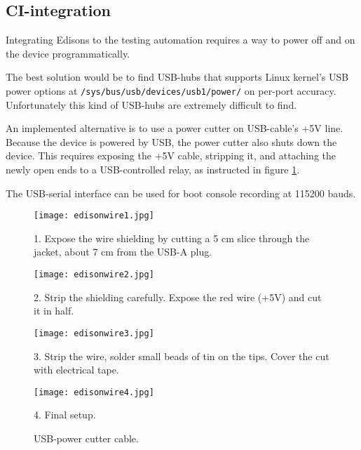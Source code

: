 \documentclass[a4paper,11pt]{article}
\newcommand{\cmd}[1]{\texttt{#1}}
\begin{document}
\subsection{CI-integration}

Integrating Edisons to the testing automation requires a way to power off and on the device programmatically.

The best solution would be to find USB-hubs that supports Linux kernel's USB power options at \cmd{/sys/bus/usb/devices/usb1/power/} on per-port accuracy. Unfortunately this kind of USB-hubs are extremely difficult to find.

An implemented alternative is to use a power cutter on USB-cable's +5V line. Because the device is powered by USB, the power cutter also shuts down the device. This requires exposing the +5V cable, stripping it, and attaching the newly open ends to a USB-controlled relay, as instructed in figure \ref{fig:usbpower}.

The USB-serial interface can be used for boot console recording at 115200 bauds.
\begin{figure}
	\centering
	\begin{minipage}[c][0.5\textheight][t]{0.49\textwidth}
	\centering
	\texttt{[image: edisonwire1.jpg]}
	
	1. Expose the wire shielding by cutting a 5 cm slice through the jacket, about 7 cm from the USB-A plug.
	\end{minipage}
	\begin{minipage}[c][0.5\textheight][t]{0.49\textwidth}
	\centering
	\texttt{[image: edisonwire2.jpg]}
	
	2. Strip the shielding carefully.	
	Expose the red wire (+5V) and cut it in half.
	\end{minipage}
	\begin{minipage}[c][0.5\textheight][t]{0.49\textwidth}
	\centering
	\texttt{[image: edisonwire3.jpg]}
	
	3. Strip the wire, solder small beads of tin on the tips.
	Cover the cut with electrical tape.
	\end{minipage}
	\begin{minipage}[c][0.5\textheight][t]{0.49\textwidth}
	\centering
	\texttt{[image: edisonwire4.jpg]}
	
	4. Final setup.
	\end{minipage}
	\caption{USB-power cutter cable.}
	\label{fig:usbpower}
\end{figure}
\end{document}
